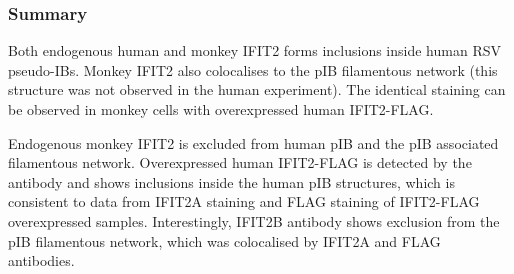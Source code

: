 \subsubsection{Summary} \label{Summary-i2-pib}
Both endogenous human and monkey IFIT2 forms inclusions inside human RSV pseudo-IBs. Monkey IFIT2 also colocalises to the pIB filamentous network (this structure was not observed in the human experiment). The identical staining can be observed in monkey cells with overexpressed human IFIT2-FLAG.

Endogenous monkey IFIT2 is excluded from human pIB and the pIB associated filamentous network. Overexpressed human IFIT2-FLAG is detected by the antibody and shows inclusions inside the human pIB structures, which is consistent to data from IFIT2A staining and FLAG staining of IFIT2-FLAG overexpressed samples. Interestingly, IFIT2B antibody shows exclusion from the pIB filamentous network, which was colocalised by IFIT2A and FLAG antibodies.